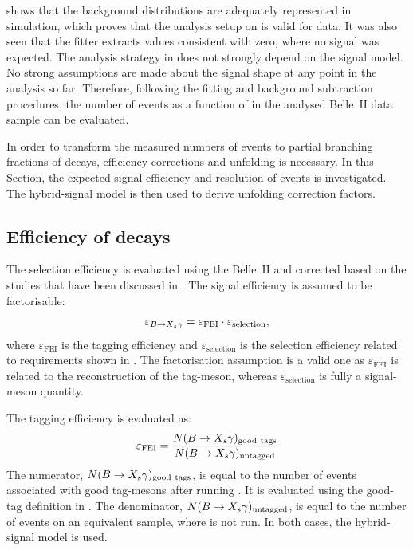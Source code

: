  shows that the background distributions are adequately represented in simulation,
which proves that the analysis setup on \MC is valid for data.
It was also seen that the \Mbc fitter extracts values consistent with zero, where no \BtoXsgamma signal was expected.
The analysis strategy in  does not strongly depend on the signal model.
No strong assumptions are made about the signal shape at any point in the analysis so far.
Therefore, following the fitting and background subtraction procedures, the number of \BtoXsgamma events as a function of \EB in the analysed Belle~II data sample can be evaluated. 

In order to transform the measured numbers of \BtoXsgamma events to partial branching fractions of \BtoXsgamma decays, efficiency corrections and unfolding is necessary.
In this Section, the expected signal efficiency and \EB resolution of \BtoXsgamma events is investigated.
The hybrid-signal model is then used to derive unfolding correction factors.

\subsection{Efficiency of \texorpdfstring{\BtoXsgamma}{B->Xs gamma} decays}\label{sec:signal_efficiency}

The \BtoXsgamma selection efficiency is evaluated using the Belle~II \MC and corrected
based on the studies that have been discussed in .
The signal efficiency is assumed to be factorisable:
\begin{equation}\label{eq:factorisable_signal_efficiency}
    \varepsilon_{\BtoXsgamma} = \varepsilon_{\mathrm{FEI}} \cdot \varepsilon_{\mathrm{selection}},
\end{equation}
where $\varepsilon_{\mathrm{FEI}}$ is the \FEI tagging efficiency and 
$\varepsilon_{\mathrm{selection}}$ is the selection efficiency related to requirements shown in .
The factorisation assumption is a valid one as $\varepsilon_{\mathrm{FEI}}$  is related to the reconstruction of the tag-\B meson,
whereas $\varepsilon_{\mathrm{selection}}$ is fully a signal-\B meson quantity.

The \FEI tagging efficiency is evaluated as:
\begin{equation}\label{eq:fei_tagging_efficiency}
    \varepsilon_{\mathrm{FEI}} = \frac{N(\BtoXsgamma)_{\mathrm{good~tags}}}{N(\BtoXsgamma)_{\mathrm{untagged}}}
\end{equation}
The numerator, $N(\BtoXsgamma)_{\mathrm{good~tags}}$, is equal to the number of \BtoXsgamma events associated with good tag-\B mesons after running \FEI. 
It is evaluated using the good-tag definition in .
The denominator, $N(\BtoXsgamma)_{\mathrm{untagged}}$, is equal to the number of \BtoXsgamma events on an equivalent sample, where \FEI is not run.
In both cases, the hybrid-signal model is used.

